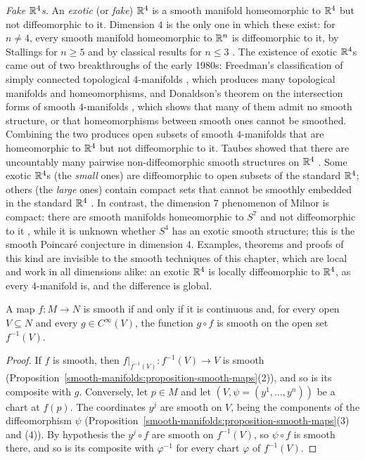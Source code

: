 \begin{remark}\label{smooth-manifolds:remark-fake-r4}
\emph{Fake $\mathbb{R}^4$s.} An \emph{exotic} (or \emph{fake}) $\mathbb{R}^4$ is a smooth manifold homeomorphic to $\mathbb{R}^4$ but not diffeomorphic to it. Dimension $4$ is the only one in which these exist: for $n \neq 4$, every smooth manifold homeomorphic to
$\mathbb{R}^n$ is diffeomorphic to it, by Stallings for $n \geq 5$ \cite{stallings-1962} and by classical results for $n \leq 3$ \cite{moise-1977}. The existence of exotic $\mathbb{R}^4$s came out of two breakthroughs of the early
1980s: Freedman's classification of simply connected topological $4$-manifolds \cite{freedman-1982}, which produces many topological manifolds and homeomorphisms, and Donaldson's theorem on the intersection forms of
smooth $4$-manifolds \cite{donaldson-1983}, which shows that many of them admit no smooth structure, or that homeomorphisms between smooth ones cannot be smoothed. Combining the two produces open subsets of
smooth $4$-manifolds that are homeomorphic to $\mathbb{R}^4$ but not diffeomorphic to it. Taubes showed that there are uncountably many pairwise non-diffeomorphic smooth structures on $\mathbb{R}^4$ \cite{taubes-1987}.
Some exotic $\mathbb{R}^4$s (the \emph{small} ones) are diffeomorphic to open subsets of the standard $\mathbb{R}^4$; others (the \emph{large} ones) contain compact sets that cannot be smoothly embedded in the standard $\mathbb{R}^4$
\cite{gompf-stipsicz}. In contrast, the dimension $7$ phenomenon of Milnor is compact: there are smooth manifolds homeomorphic to $S^7$ and not diffeomorphic to it \cite{milnor-1956}, while it is unknown whether $S^4$ has an exotic
smooth structure; this is the smooth Poincar\'e conjecture in dimension $4$. Examples, theorems and proofs of this kind are invisible to the smooth techniques of this chapter, which are local and work in all
dimensions alike: an exotic $\mathbb{R}^4$ is locally diffeomorphic to $\mathbb{R}^4$, as every $4$-manifold is, and the difference is global.
\end{remark}

\begin{proposition}\label{smooth-manifolds:proposition-pullback-criterion}
A map $f \colon M \to N$ is smooth if and only if it is continuous and, for every open $V \subseteq N$ and every $g \in C^\infty(V)$, the function $g \circ f$
is smooth on the open set $f^{-1}(V)$.
\end{proposition}

\begin{proof}
If $f$ is smooth, then $f|_{f^{-1}(V)} \colon f^{-1}(V) \to V$ is smooth (Proposition~\ref{smooth-manifolds:proposition-smooth-maps}(2)), and so is its
composite with $g$. Conversely, let $p \in M$ and let $(V, \psi = (y^1, \ldots, y^n))$ be a chart at $f(p)$. The coordinates $y^j$ are smooth on $V$, being the
components of the diffeomorphism $\psi$ (Proposition~\ref{smooth-manifolds:proposition-smooth-maps}(3) and (4)). By hypothesis the $y^j \circ f$ are smooth on
$f^{-1}(V)$, so $\psi \circ f$ is smooth there, and so is its composite with $\varphi^{-1}$ for every chart $\varphi$ of $f^{-1}(V)$.
\end{proof}

